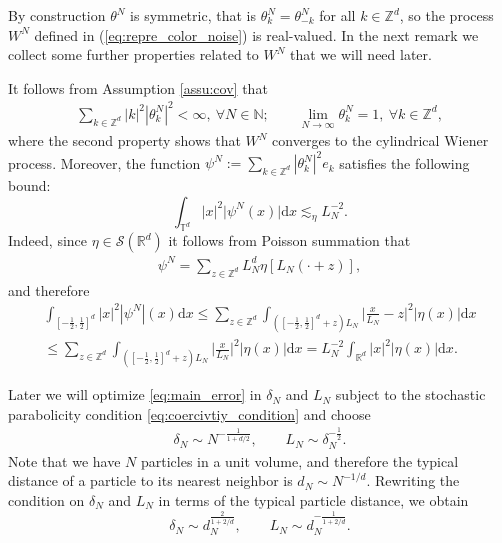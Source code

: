 By construction $\theta^N$ is symmetric, that is $\theta_k^N = \theta_{-k}^N$ for all $k \in \mathbb{Z}^d$, so the process $W^N$ defined in (\ref{eq:repre_color_noise}) is real-valued. In the next remark we collect some further properties related to $W^N$ that we will need later.
\begin{rem}
It follows from Assumption \ref{assu:cov} that
\begin{equation}\label{eq:bound_theta}
\begin{split}
\sum_{k \in \mathbb{Z}^d} |k|^2|\theta_k^N|^2 < \infty, \ \forall N \in \mathbb{N}; \qquad \lim_{N \to \infty}\theta_k^N = 1, \ \forall k \in \mathbb{Z}^d,
\end{split}
\end{equation}
where the second property shows that $W^N$ converges to the cylindrical Wiener process. Moreover, the function $\psi^N := \sum_{k \in \mathbb{Z}^d} |\theta_k^N|^2e_k$ satisfies the following bound:
\begin{equation}\label{eq:s_m_kernel_Ktheta}
\int_{\mathbb{T}^d}|x|^2 \big|\psi^N(x)\big|\mathrm{d}x \lesssim_{\eta} L_N^{-2}.
\end{equation}
Indeed, since $\eta \in \mathscr{S}(\mathbb{R}^d)$ it follows from Poisson summation that 
     \begin{align*}
          \psi^N = \sum_{z \in \mathbb{Z}^d}L_N^d\eta[L_N(\cdot + z)],
     \end{align*}
and therefore
\begin{align*}
    \int_{[-\frac{1}{2},\frac{1}{2}]^d}|x|^2|\psi^N|(x)\mathrm{d}x 
     \leq \sum_{z \in \mathbb{Z}^d} \int_{([-\frac{1}{2},\frac{1}{2}]^d + z)L_N}\big|\frac{x}{L_N}- z\big|^2|\eta(x)|\mathrm{d}x\\
     \leq \sum_{z \in \mathbb{Z}^d} \int_{([-\frac{1}{2},\frac{1}{2}]^d + z)L_N}\big|\frac{x}{L_N}\big|^2|\eta(x)|\mathrm{d}x
     = L_N^{-2}\int_{\mathbb{R}^d}|x|^2|\eta(x)|\mathrm{d}x.
\end{align*}
\end{rem}

Later we will optimize \eqref{eq:main_error} in $\delta_N$ and $L_N$ subject to the stochastic parabolicity condition \eqref{eq:coercivtiy_condition} and choose 
\begin{align*}
\delta_N \sim N^{-\frac{1}{1+d/2}}, \qquad L_N \sim \delta^{-\frac{1}{2}}_N. 
\end{align*}
Note that we have $N$ particles in a unit volume, and therefore the typical distance of a particle to its nearest neighbor is $d_N\sim N^{-1/d}$. Rewriting the condition on $\delta_N$ and $L_N$ in terms of the typical particle distance, we obtain
\[
    \delta_N \sim d_N^{\frac{2}{1+2/d}},\qquad L_N \sim d_N^{-\frac{1}{1+2/d}}.
\]
